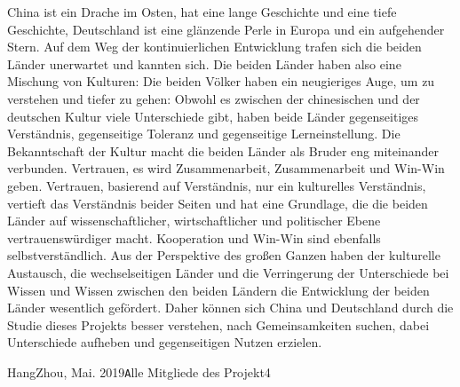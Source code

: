  China ist ein Drache im Osten, hat eine lange Geschichte und eine tiefe Geschichte, Deutschland ist eine glänzende Perle in Europa und ein aufgehender Stern. Auf dem Weg der kontinuierlichen Entwicklung trafen sich die beiden Länder unerwartet und kannten sich. Die beiden Länder haben also eine Mischung von Kulturen: Die beiden Völker haben ein neugieriges Auge, um zu verstehen und tiefer zu gehen: Obwohl es zwischen der chinesischen und der deutschen Kultur viele Unterschiede gibt, haben beide Länder gegenseitiges Verständnis, gegenseitige Toleranz und gegenseitige Lerneinstellung. Die Bekanntschaft der Kultur macht die beiden Länder als Bruder eng miteinander verbunden. Vertrauen, es wird Zusammenarbeit, Zusammenarbeit und Win-Win geben. Vertrauen, basierend auf Verständnis, nur ein kulturelles Verständnis, vertieft das Verständnis beider Seiten und hat eine Grundlage, die die beiden Länder auf wissenschaftlicher, wirtschaftlicher und politischer Ebene vertrauenswürdiger macht. Kooperation und Win-Win sind ebenfalls selbstverständlich. Aus der Perspektive des großen Ganzen haben der kulturelle Austausch, die wechselseitigen Länder und die Verringerung der Unterschiede bei Wissen und Wissen zwischen den beiden Ländern die Entwicklung der beiden Länder wesentlich gefördert. Daher können sich China und Deutschland durch die Studie dieses Projekts besser verstehen, nach Gemeinsamkeiten suchen, dabei Unterschiede aufheben und gegenseitigen Nutzen erzielen.
\vspace{\baselineskip}
\begin{flushright}\noindent
HangZhou, Mai.  2019\hfill {\texttt Alle Mitgliede des Projekt4}\\
\end{flushright}
